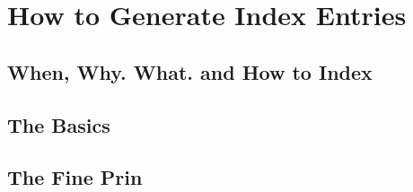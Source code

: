 \section{How to Generate Index Entries}
\subsection{When, Why. What. and How to Index}


\subsection{The Basics}


\subsection{The Fine Prin}